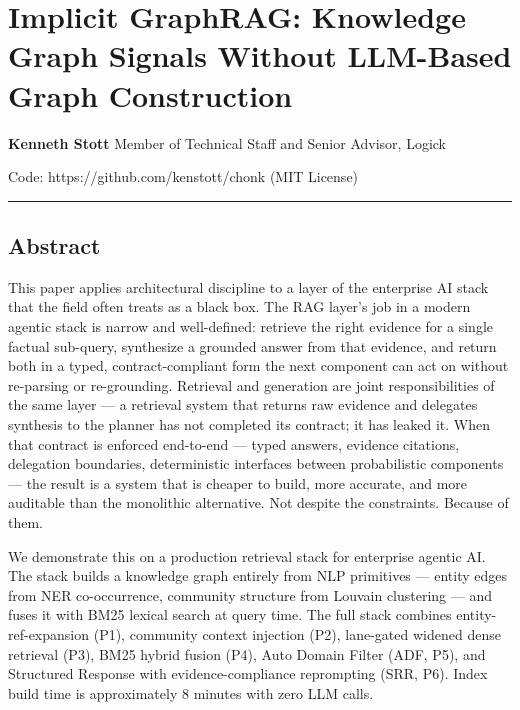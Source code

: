 \documentclass[
]{article}
\author{}
\date{}
\begin{document}
\section{Implicit GraphRAG: Knowledge Graph Signals Without LLM-Based
Graph
Construction}\label{implicit-graphrag-knowledge-graph-signals-without-llm-based-graph-construction}

\textbf{Kenneth Stott} Member of Technical Staff and Senior Advisor,
Logick

Code: https://github.com/kenstott/chonk (MIT License)

\begin{center}\rule{0.5\linewidth}{0.5pt}\end{center}

\subsection{Abstract}\label{abstract}

This paper applies architectural discipline to a layer of the enterprise
AI stack that the field often treats as a black box. The RAG layer's job
in a modern agentic stack is narrow and well-defined: retrieve the right
evidence for a single factual sub-query, synthesize a grounded answer
from that evidence, and return both in a typed, contract-compliant form
the next component can act on without re-parsing or re-grounding.
Retrieval and generation are joint responsibilities of the same layer
--- a retrieval system that returns raw evidence and delegates synthesis
to the planner has not completed its contract; it has leaked it. When
that contract is enforced end-to-end --- typed answers, evidence
citations, delegation boundaries, deterministic interfaces between
probabilistic components --- the result is a system that is cheaper to
build, more accurate, and more auditable than the monolithic
alternative. Not despite the constraints. Because of them.

We demonstrate this on a production retrieval stack for enterprise
agentic AI. The stack builds a knowledge graph entirely from NLP
primitives --- entity edges from NER co-occurrence, community structure
from Louvain clustering --- and fuses it with BM25 lexical search at
query time. The full stack combines entity-ref-expansion (P1), community
context injection (P2), lane-gated widened dense retrieval (P3), BM25
hybrid fusion (P4), Auto Domain Filter (ADF, P5), and Structured
Response with evidence-compliance reprompting (SRR, P6). Index build
time is approximately 8 minutes with zero LLM calls.
\end{document}
